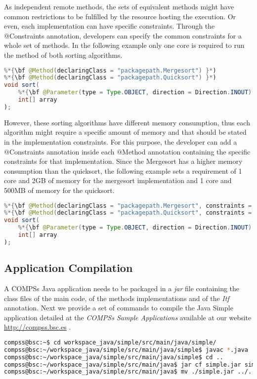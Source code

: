 As independent remote methods, the sets of equivalent methods might have common restrictions to be
fulfilled by the resource hosting the execution. Or even, each implementation can have specific constraints.
Through the @Constraints annotation, developers can specify the common constraints for a whole set of
methods. In the following example only one core is required to run the method of both sorting algorithms.

\begin{lstlisting}[language=java]
%*{\bf @Constraints(computingUnits = "1") }*)
%*{\bf @Method(declaringClass = "packagepath.Mergesort") }*)
%*{\bf @Method(declaringClass = "packagepath.Quicksort") }*)  
void sort(
    %*{\bf @Parameter(type = Type.OBJECT, direction = Direction.INOUT) }*)
    int[] array
);
\end{lstlisting}

However, these sorting algorithms have different memory consumption, thus each algorithm might require a
specific amount of memory and that should be stated in the implementation constraints. For this purpose, the
developer can add a @Constraints annotation inside each @Method annotation containing the specific constraints for that
implementation. Since the Mergesort has a higher memory consumption than the quicksort, the following
example sets a requirement of 1 core and 2GB of memory for the mergesort implementation and 1 core and
500MB of memory for the quicksort.

\begin{lstlisting}[language=java]
%*{\bf @Constraints(computingUnits = "1") }*)
%*{\bf @Method(declaringClass = "packagepath.Mergesort", constraints = @Constraints(memorySize = "2.0")) }*)
%*{\bf @Method(declaringClass = "packagepath.Quicksort", constraints = @Constraints(memorySize = "0.5")) }*)
void sort(
    %*{\bf @Parameter(type = Type.OBJECT, direction = Direction.INOUT) }*)
    int[] array
);
\end{lstlisting}

\subsection{Application Compilation}
A COMPSs Java application needs to be packaged in a \textit{jar} file containing the class files of the main code, of the methods implementations and of the \textit{Itf} annotation.
Next we provide a set of commands to compile the Java Simple application detailed at the \textit{COMPSs Sample Applications} 
available at our website \url{http://compss.bsc.es} .
\begin{lstlisting}[language=bash]
compss@bsc:~$ cd workspace_java/simple/src/main/java/simple/
compss@bsc:~/workspace_java/simple/src/main/java/simple$ javac *.java
compss@bsc:~/workspace_java/simple/src/main/java/simple$ cd ..
compss@bsc:~/workspace_java/simple/src/main/java$ jar cf simple.jar simple/
compss@bsc:~/workspace_java/simple/src/main/java$ mv ./simple.jar ../../../jar/
\end{lstlisting}


